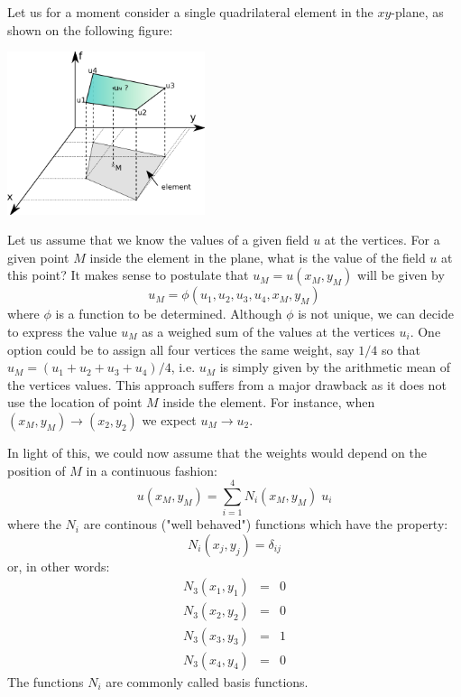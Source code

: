 Let us for a moment consider a single quadrilateral element in the $xy$-plane, 
as shown on the following figure:
\begin{center}
\includegraphics[width=5.8cm]{images/shape}
\end{center}
Let us assume that we know the values of a given field $u$ at the vertices.
For a given point $M$ inside the element in the plane, what is the value of the 
field $u$ at this point?
It makes sense to postulate that $u_M=u(x_M,y_M)$ will be given  by 
\[
u_M= \phi(u_1,u_2,u_3,u_4,x_M,y_M) 
\]
where $\phi$ is a function to be determined. Although $\phi$ is not unique, we can 
decide to express the value $u_M$ as a weighed sum of the values at the vertices $u_i$.
One option could be to assign all four vertices the same weight, say $1/4$ so that 
$u_M=(u_1+u_2+u_3+u_4)/4$, i.e. $u_M$ is simply given by the arithmetic mean 
of the vertices values. This approach suffers from a major drawback as it does
not use the location of point $M$ inside the element. For instance, when 
$(x_M,y_M) \rightarrow (x_2,y_2)$ we expect $u_M \rightarrow u_2$.

In light of this, we could now assume that the weights would depend on the position 
of $M$ in a continuous fashion:
\[
u(x_M,y_M) = \sum_{i=1}^4 N_i(x_M,y_M)\;  u_i
\]
where the $N_i$ are continous ("well behaved") functions which have the property:
\[
N_i(x_j,y_j)=\delta_{ij}
\]
or, in other words: 
\begin{eqnarray}
N_3(x_1,y_1) &=& 0 \\
N_3(x_2,y_2) &=& 0 \\
N_3(x_3,y_3) &=& 1 \\
N_3(x_4,y_4) &=& 0 
\end{eqnarray}
The functions $N_i$ are commonly called basis functions. 

